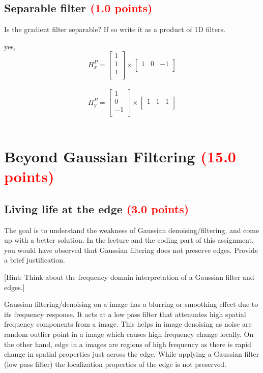 \documentclass[answers]{exam}
\newcommand{\mypoints}[1]{\textcolor{red}{(#1 points)}}
\begin{document}
\subsection{Separable filter \mypoints{1.0}}
Is the gradient filter separable? If so write it as a product of 1D filters.

\begin{solution}
yes,\\
$$H_x^P = \begin{bmatrix}
1\\
1\\
1\\
\end{bmatrix} 
\times
\begin{bmatrix}
1 & 0 & -1\\
\end{bmatrix}$$ \\

$$H_y^P = \begin{bmatrix}
1\\
0\\
-1\\
\end{bmatrix} 
\times
\begin{bmatrix}
1 & 1 & 1\\
\end{bmatrix}$$ \\
\end{solution}


\newpage
\section{Beyond Gaussian Filtering \mypoints{15.0}}
\label{Gaussian Filtering}
\subsection{Living life at the edge \mypoints{3.0}}\label{sssec:derivation}
The goal is to understand the weakness of Gaussian denoising/filtering, and come up with a better solution. In the lecture and the coding part of this assignment, you would have observed that Gaussian filtering does not preserve edges. Provide a brief justification.

[Hint: Think about the frequency domain interpretation of a Gaussian filter and edges.]
\begin{solution}
Gaussian filtering/denoising on a image has a blurring or smoothing effect due to its frequency response. It acts at a low pass filter that attenuates high spatial frequency components from a image. This helps in image denoising as noise are random outlier point in a image which causes high frequency change locally. On the other hand, edge in a images are regions of high frequency as there is rapid change in spatial properties just across the edge. While applying a Gaussian filter (low pass filter) the localization properties of the edge is not preserved.
\end{solution}
\end{document}
